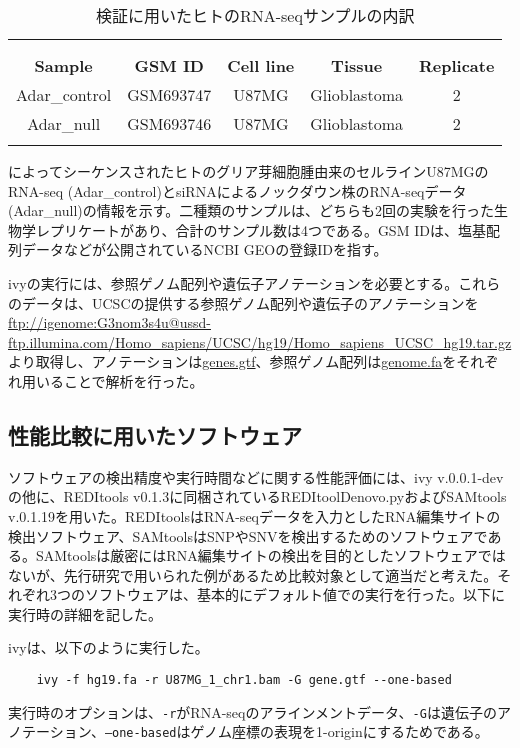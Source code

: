 \begin{longtable}{ccccc}
	\vspace{-0.5cm}
	\label{tab:bahn_sample}\\
	\caption{検証に用いたヒトのRNA-seqサンプルの内訳}\\
	\cline{1-5}
	\textbf{Sample} & \textbf{GSM ID} & \textbf{Cell line} & \textbf{Tissue} & \textbf{Replicate}\\
	\cline{1-5}
	Adar\_control & GSM693747 & U87MG & Glioblastoma & 2\\
	Adar\_null & GSM693746 & U87MG & Glioblastoma & 2\\
	\cline{1-5}
	\vspace{-0.8cm}
\end{longtable}

\begin{flushleft}
	\small{\cite{BahLeeLi1201}によってシーケンスされたヒトのグリア芽細胞腫由来のセルラインU87MGのRNA-seq (Adar\_control)とsiRNAによるノックダウン株のRNA-seqデータ (Adar\_null)の情報を示す。二種類のサンプルは、どちらも2回の実験を行った生物学レプリケートがあり、合計のサンプル数は4つである。GSM IDは、塩基配列データなどが公開されているNCBI GEOの登録IDを指す。}
\end{flushleft}

ivyの実行には、参照ゲノム配列や遺伝子アノテーションを必要とする。これらのデータは、UCSCの提供する参照ゲノム配列や遺伝子のアノテーションを\url{ftp://igenome:G3nom3s4u@ussd-ftp.illumina.com/Homo_sapiens/UCSC/hg19/Homo_sapiens_UCSC_hg19.tar.gz}より取得し、アノテーションは\url{genes.gtf}、参照ゲノム配列は\url{genome.fa}をそれぞれ用いることで解析を行った。

\subsection{性能比較に用いたソフトウェア}
ソフトウェアの検出精度や実行時間などに関する性能評価には、ivy v.0.0.1-devの他に、REDItools v0.1.3に同梱されているREDItoolDenovo.pyおよびSAMtools v.0.1.19を用いた。REDItoolsはRNA-seqデータを入力としたRNA編集サイトの検出ソフトウェア、SAMtoolsはSNPやSNVを検出するためのソフトウェアである。SAMtoolsは厳密にはRNA編集サイトの検出を目的としたソフトウェアではないが、先行研究で用いられた例があるため比較対象として適当だと考えた。それぞれ3つのソフトウェアは、基本的にデフォルト値での実行を行った。以下に実行時の詳細を記した。

ivyは、以下のように実行した。
{\small
\begin{verbatim}
	ivy -f hg19.fa -r U87MG_1_chr1.bam -G gene.gtf --one-based
\end{verbatim}
}
実行時のオプションは、\texttt{-r}がRNA-seqのアラインメントデータ、\texttt{-G}は遺伝子のアノテーション、\texttt{--one-based}はゲノム座標の表現を1-originにするためである。


